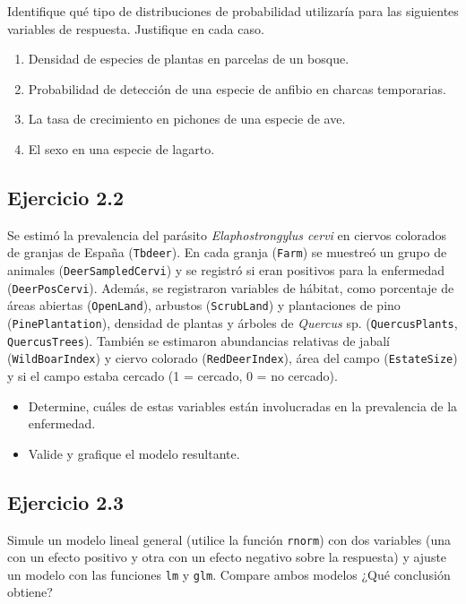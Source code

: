 \documentclass[
]{book}
\begin{document}
Identifique qué tipo de distribuciones de probabilidad utilizaría para las siguientes variables de respuesta. Justifique en cada caso.

\begin{enumerate}
\def\labelenumi{\alph{enumi}.}
\item
  Densidad de especies de plantas en parcelas de un bosque.
\item
  Probabilidad de detección de una especie de anfibio en charcas temporarias.
\item
  La tasa de crecimiento en pichones de una especie de ave.
\item
  El sexo en una especie de lagarto.
\end{enumerate}

\hypertarget{ejercicio-2.2}{%
\subsection{Ejercicio 2.2}\label{ejercicio-2.2}}

Se estimó la prevalencia del parásito \emph{Elaphostrongylus cervi} en ciervos colorados de granjas de España (\texttt{Tbdeer}). En cada granja (\texttt{Farm}) se muestreó un grupo de animales (\texttt{DeerSampledCervi}) y se registró si eran positivos para la enfermedad (\texttt{DeerPosCervi}). Además, se registraron variables de hábitat, como porcentaje de áreas abiertas (\texttt{OpenLand}), arbustos (\texttt{ScrubLand}) y plantaciones de pino (\texttt{PinePlantation}), densidad de plantas y árboles de \emph{Quercus} sp. (\texttt{QuercusPlants}, \texttt{QuercusTrees}). También se estimaron abundancias relativas de jabalí (\texttt{WildBoarIndex}) y ciervo colorado (\texttt{RedDeerIndex}), área del campo (\texttt{EstateSize}) y si el campo estaba cercado (1 = cercado, 0 = no cercado).

\begin{itemize}
\item
  Determine, cuáles de estas variables están involucradas en la prevalencia de la enfermedad.
\item
  Valide y grafique el modelo resultante.
\end{itemize}

\hypertarget{ejercicio-2.3}{%
\subsection{Ejercicio 2.3}\label{ejercicio-2.3}}

Simule un modelo lineal general (utilice la función \texttt{rnorm}) con dos variables (una con un efecto positivo y otra con un efecto negativo sobre la respuesta) y ajuste un modelo con las funciones \texttt{lm} y \texttt{glm}. Compare ambos modelos ¿Qué conclusión obtiene?
\end{document}
